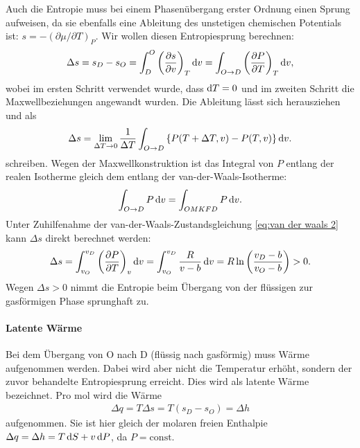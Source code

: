 Auch die Entropie muss bei einem Phasenübergang erster Ordnung einen Sprung aufweisen, da sie ebenfalls eine Ableitung des unstetigen chemischen Potentials ist: $s=-(\partial\mu/\partial T)_P$. Wir wollen diesen Entropiesprung berechnen:
\begin{align*}
    \Delta s = s_D-s_O = \int_D^O \left( \frac{\partial s}{\partial v} \right)_T\mathop{}\!\mathrm{d} v = \int_{O\rightarrow D} \left( \frac{\partial P}{\partial T} \right)_T\mathop{}\!\mathrm{d} v,
\end{align*}
wobei im ersten Schritt verwendet wurde, dass $\mathop{}\!\mathrm{d} T=0$ und im zweiten Schritt die Maxwellbeziehungen angewandt wurden. Die Ableitung lässt sich herausziehen und als 
\begin{align*}
    \Delta s = \lim_{\Delta T\rightarrow 0} \frac{1}{\Delta T} \int_{O\rightarrow D}\left\{ P(T+\Delta T,v) - P(T,v) \right\}\mathop{}\!\mathrm{d} v.
\end{align*}
schreiben. Wegen der Maxwellkonstruktion ist das Integral von $P$ entlang der realen Isotherme gleich dem entlang der van-der-Waals-Isotherme:
\begin{align*}
    \int_{O\rightarrow D} P\mathop{}\!\mathrm{d} v = \int_{OMKFD} P\mathop{}\!\mathrm{d} v.
\end{align*}
Unter Zuhilfenahme der van-der-Waals-Zustandsgleichung \eqref{eq:van der waals 2} kann $\Delta s$ direkt berechnet werden:
\begin{align}
    \Delta s = \int_{v_O}^{v_D} \left(\frac{\partial P }{\partial T}\right)_v\mathop{}\!\mathrm{d} v = \int_{v_O}^{v_D} \frac{R}{v-b}\mathop{}\!\mathrm{d} v = R \ln\left( \frac{v_D-b}{v_O-b} \right) > 0. 
\end{align}
Wegen $\Delta s>0$ nimmt die Entropie beim Übergang von der flüssigen zur gasförmigen Phase sprunghaft zu. 


\paragraph*{Latente Wärme}

Bei dem Übergang von O nach D (flüssig nach gasförmig) muss Wärme aufgenommen werden. Dabei wird aber nicht die Temperatur erhöht, sondern der zuvor behandelte Entropiesprung erreicht. Dies wird als latente Wärme bezeichnet. Pro \unit{\mole} wird die Wärme
\begin{align}
    \Delta q = T\Delta s = T(s_D-s_O) = \Delta h
\end{align}
aufgenommen. Sie ist hier gleich der molaren freien Enthalpie $\Delta q = \Delta h = T\mathop{}\!\mathrm{d} S+v\mathop{}\!\mathrm{d} P$, da $P=\mathrm{const}$. 